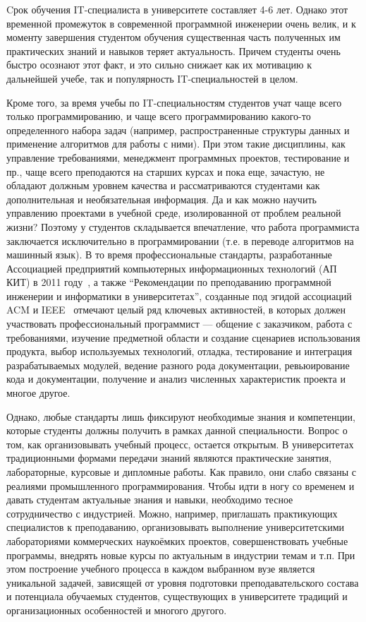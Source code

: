 \documentclass[a4paper]{article}
\begin{document}
Cрок обучения IT-специалиста в университете составляет 4-6 лет. Однако этот временной промежуток  в современной программной инженерии очень велик, и к моменту завершения студентом обучения существенная часть полученных им практических знаний и навыков теряет актуальность. Причем студенты очень быстро осознают этот факт, и это сильно снижает как их мотивацию к дальнейшей учебе, так и популярность IT-специальностей в целом. 

Кроме того, за время учебы по IT-специальностям студентов учат чаще всего только программированию, и чаще всего программированию  какого-то определенного набора задач (например, распространенные структуры данных и применение алгоритмов для работы с ними). При этом такие дисциплины, как управление требованиями, менеджмент программных проектов, тестирование и пр., чаще всего преподаются на старших курсах и пока еще, зачастую, не обладают должным уровнем качества и рассматриваются студентами как дополнительная и необязательная информация. Да и как можно научить управлению проектами в учебной среде, изолированной от проблем реальной жизни? Поэтому у студентов складывается впечатление, что работа программиста заключается исключительно в программировании  (т.е. в переводе алгоритмов на машинный язык). В то время профессиональные стандарты, разработанные Ассоциацией предприятий компьютерных информационных технологий (АП КИТ) в 2011 году~\cite{apkit}, а также ``Рекомендации по преподаванию программной инженерии и информатики в университетах'', созданные под эгидой ассоциаций ACM и  IEEE~\cite{curriculum, terekhov2} отмечают целый ряд ключевых активностей, в которых должен участвовать профессиональный программист --- общение с заказчиком, работа с требованиями, изучение предметной области и создание сценариев использования продукта, выбор используемых технологий, отладка, тестирование и интеграция разрабатываемых модулей, ведение разного рода документации, ревьюирование кода и документации, получение и анализ численных характеристик проекта и многое другое. 

Однако, любые стандарты лишь фиксируют необходимые знания и компетенции, которые студенты должны получить в рамках данной специальности. Вопрос о том, как организовывать учебный процесс, остается открытым. В университетах традиционными формами передачи знаний  являются практические занятия, лабораторные, курсовые и дипломные работы. Как правило, они слабо связаны с реалиями промышленного программирования. Чтобы идти в ногу со временем и давать студентам актуальные знания и навыки, необходимо тесное сотрудничество с индустрией. Можно, например, приглашать практикующих специалистов к преподаванию, организовывать выполнение университетскими лабораториями коммерческих наукоёмких  проектов, совершенствовать учебные программы, внедрять новые курсы по актуальным в индустрии темам и т.п. При этом построение учебного процесса в каждом выбранном вузе является уникальной задачей, зависящей от уровня подготовки преподавательского состава и потенциала обучаемых студентов, существующих в университете традиций и организационных особенностей и многого другого. 
\end{document}
